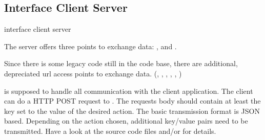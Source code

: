 \subsection{Interface Client Server}
\label{sec:iface_c_s}

interface client server



%
%
%
%
%







The server offers three points to exchange data: ,  and .

Since there is some legacy code still in the code base, there are additional, depreciated url access points to exchange data. (, , , , , )

 is supposed to handle all communication with the client application.
The client can do a HTTP POST request to \splurl[api].
The requests body should contain at least the key  set to the value of the desired action.
The basic transmission format is JSON based.
Depending on the action chosen, additional key/value pairs need to be transmitted.
Have a look at the source code files  and/or  for details.



